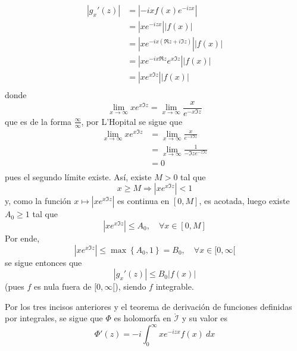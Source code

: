 \documentclass[12pt]{report}
\newcounter{it}
\theoremstyle{largebreak}
\renewcommand{\leq}{\ensuremath{\leqslant}}
\renewcommand{\geq}{\ensuremath{\geqslant}}
\newcommand\abs[1]{\ensuremath{\left|#1\right|}}
\begin{document}
\begin{sol}
\begin{itemize}
\begin{equation*}
\begin{split}
                    \abs{g_x'(z)}&=\abs{-ixf(x)e^{ -izx}}\\
                    &=\abs{xe^{ -izx}}\abs{f(x)}\\
                    &=\abs{xe^{ -ix(\Re z+i\Im z)}}\abs{f(x)}\\
                    &=\abs{xe^{ -ix\Re z}e^{x\Im z}}\abs{f(x)}\\
                    &=\abs{xe^{x\Im z}}\abs{f(x)}\\
                \end{split}
            \end{equation*}
            donde
            \begin{equation*}
                \lim_{x\rightarrow\infty}xe^{x\Im z}=\lim_{x\rightarrow\infty}\frac{x}{e^{-x\Im z}}
            \end{equation*}
            que es de la forma $\frac{\infty}{\infty}$, por L'Hopital se sigue que
            \begin{equation*}
                \begin{split}
                    \lim_{x\rightarrow\infty}xe^{x\Im z}&=\lim_{x\rightarrow\infty}\frac{x}{e^{-x\Im z}}\\
                    &=\lim_{x\rightarrow\infty}\frac{1}{-\Im ze^{ -z\Im z}}\\
                    &=0\\
                \end{split}
            \end{equation*}
            pues el segundo límite existe. Así, existe $M>0$ tal que
            \begin{equation*}
                x\geq M\Rightarrow \abs{xe^{x\Im z}}<1
            \end{equation*}
            y, como la función $x\mapsto\abs{xe^{x\Im z}}$ es continua en $[0,M]$, es acotada, luego existe $A_0\geq 1$ tal que
            \begin{equation*}
                \abs{xe^{x\Im z}}\leq A_0,\quad\forall x\in[0,M]
            \end{equation*}
            Por ende,
            \begin{equation*}
                \abs{xe^{x\Im z}}\leq\max\left\{A_0,1\right\}=B_0,\quad\forall x\in[0,\infty[
            \end{equation*}
            se sigue entonces que
            \begin{equation*}
                \abs{g_x'(z)}\leq B_0\abs{f(x)}
            \end{equation*}
            (pues $f$ es nula fuera de $[0,\infty[$), siendo $f$ integrable.
        \end{itemize}
        Por los tres incisos anteriores y el teorema de derivación de funciones definidas por integrales, se sigue que $\Phi$ es holomorfa en $\mathring{\mathcal{I}}$ y su valor es
        \begin{equation*}
            \Phi'(z)=-i\int_{0}^{\infty}xe^{ -izx}f(x)\:dx
        \end{equation*}


\end{sol}
\end{document}
